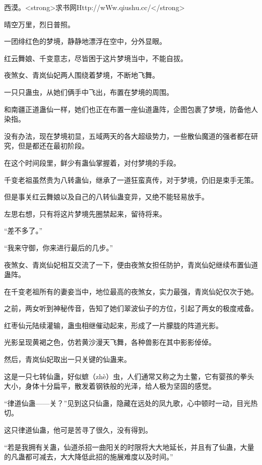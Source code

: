 
\begin{this_body}

西漠。<strong>求书网Http://wWw.qiushu.cc/</strong>

晴空万里，烈日普照。

一团绯红色的梦境，静静地漂浮在空中，分外显眼。

红云舞娘、千变意志，尽皆困于这片梦境当中，不能自拔。

夜煞女、青岚仙妃两人围绕着梦境，不断地飞舞。

一只只蛊虫，从她们俩手中飞出，布置在梦境的周围。

和南疆正道蛊仙一样，她们也正在布置一座仙道蛊阵，企图包裹了梦境，防备他人染指。

没有办法，现在梦境初显，五域两天的各大超级势力，一些散仙魔道的强者都在研究，但是都还在最初阶段。

在这个时间段里，鲜少有蛊仙掌握着，对付梦境的手段。

千变老祖虽然贵为八转蛊仙，继承了一道狂蛮真传，对于梦境，仍旧是束手无策。

但是事关红云舞娘以及自己的八转仙蛊变异，又绝不能轻易放手。

左思右想，只有将这片梦境先圈禁起来，留待将来。

“差不多了。”

“我来守御，你来进行最后的几步。”

夜煞女、青岚仙妃相互交流了一下，便由夜煞女担任防护，青岚仙妃继续布置仙道蛊阵。

在千变老祖所有的妻妾当中，地位最高的夜煞女，实力最强，青岚仙妃仅次于她。

之前，两女听到神秘传音，告知了她们翠波仙子的方位，引起了两女的极度戒备。

红枣仙元陆续灌输，蛊虫相继催动起来，形成了一片朦胧的阵道光影。

光影呈现黄褐之色，仿若黄沙漫天飞舞，各种兽影在其中影影倬倬。

然后，青岚仙妃取出一只关键的仙蛊来。

这是一只七转仙蛊，好似蟅（zhè）虫，人们通常又称之为土鳖，它有婴孩的拳头大小，身体十分扁平，散发着钢铁般的光泽，给人极为坚固的感觉。

“律道仙蛊——关？”见到这只仙蛊，隐藏在远处的凤九歌，心中顿时一动，目光热切。

这只律道仙蛊，他可是苦寻了很久，没有得到。

“若是我拥有关蛊，仙道杀招一曲阳关的时限将大大地延长，并且有了仙蛊，大量的凡蛊都可减去，大大降低此招的施展难度以及时间。”


\end{this_body}
